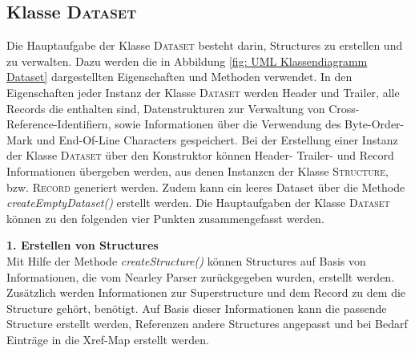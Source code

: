 \subsection{Klasse \textsc{Dataset}}
\label{subsec: Implementierung - Gedcom Struktur - Klasse Dataset}
Die Hauptaufgabe der Klasse \textsc{Dataset} besteht darin, Structures zu erstellen und zu verwalten. Dazu werden die in Abbildung \ref{fig: UML Klassendiagramm Dataset} dargestellten Eigenschaften und Methoden verwendet. In den Eigenschaften jeder Instanz der Klasse \textsc{Dataset} werden Header und Trailer, alle Records die enthalten sind, Datenstrukturen zur Verwaltung von Cross-Reference-Identifiern, sowie Informationen über die Verwendung des Byte-Order-Mark und End-Of-Line Characters gespeichert. Bei der Erstellung einer Instanz der Klasse \textsc{Dataset} über den Konstruktor können Header- Trailer- und Record Informationen übergeben werden, aus denen Instanzen der Klasse \textsc{Structure}, bzw. \textsc{Record} generiert werden. Zudem kann ein leeres Dataset über die Methode \textit{createEmptyDataset()} erstellt werden. Die Hauptaufgaben der Klasse \textsc{Dataset} können zu den folgenden vier Punkten zusammengefasst werden.

\vspace{1em}
\textbf{1. Erstellen von Structures} \vspace{0.5em} \\
Mit Hilfe der Methode \textit{createStructure()} können Structures auf Basis von Informationen, die vom Nearley Parser zurückgegeben wurden, erstellt werden. Zusätzlich werden Informationen zur Superstructure und dem Record zu dem die Structure gehört, benötigt. Auf Basis dieser Informationen kann die passende Structure erstellt werden, Referenzen andere Structures angepasst und bei Bedarf Einträge in die Xref-Map erstellt werden. 

